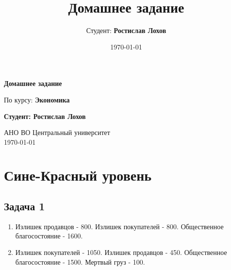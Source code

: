 \documentclass[a4paper,12pt]{article}
\title{Домашнее задание}
\author{Студент: \textbf{Ростислав Лохов}}
\date{\today}
\begin{document}
\begin{titlepage}
    \centering
    \vspace*{1cm}

    \Huge
    \textbf{Домашнее задание}

    \vspace{0.5cm}
    \LARGE
    По курсу: \textbf{Экономика}

    \vspace{1.5cm}

    \textbf{Студент: Ростислав Лохов}

    \vfill

    \Large
    АНО ВО Центральный университет\\
    \vspace{0.3cm}
    \today

\end{titlepage}

\tableofcontents
\newpage

\section{Сине-Красный уровень}


\subsection{Задача 1}
\begin{enumerate}
    \item Излишек продавцов - 800. Излишек покупателей - 800. Общественное благосостояние - 1600.
    \item Излишек покупателей - 1050. Излишек продавцов - 450. Общественное благосостояние - 1500. Мертвый груз - 100. 
\end{enumerate}
\end{document}
